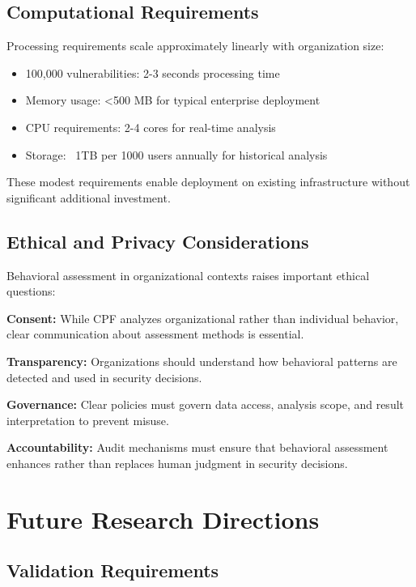 \documentclass[10pt, twocolumn]{article}
\begin{document}
\subsection{Computational Requirements}

Processing requirements scale approximately linearly with organization size:

\begin{itemize}
\item 100,000 vulnerabilities: 2-3 seconds processing time
\item Memory usage: <500 MB for typical enterprise deployment
\item CPU requirements: 2-4 cores for real-time analysis
\item Storage: ~1TB per 1000 users annually for historical analysis
\end{itemize}

These modest requirements enable deployment on existing infrastructure without significant additional investment.

\subsection{Ethical and Privacy Considerations}

Behavioral assessment in organizational contexts raises important ethical questions:

\textbf{Consent:} While CPF analyzes organizational rather than individual behavior, clear communication about assessment methods is essential.

\textbf{Transparency:} Organizations should understand how behavioral patterns are detected and used in security decisions.

\textbf{Governance:} Clear policies must govern data access, analysis scope, and result interpretation to prevent misuse.

\textbf{Accountability:} Audit mechanisms must ensure that behavioral assessment enhances rather than replaces human judgment in security decisions.

\section{Future Research Directions}

\subsection{Validation Requirements}
\end{document}
